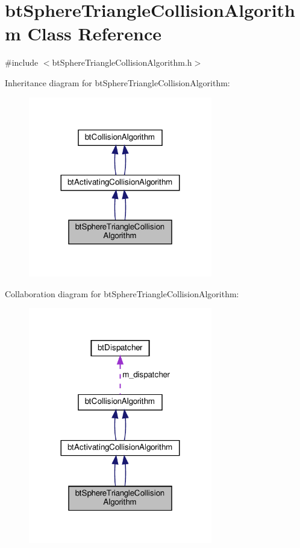 \hypertarget{classbtSphereTriangleCollisionAlgorithm}{}\section{bt\+Sphere\+Triangle\+Collision\+Algorithm Class Reference}
\label{classbtSphereTriangleCollisionAlgorithm}


{\ttfamily \#include $<$bt\+Sphere\+Triangle\+Collision\+Algorithm.\+h$>$}



Inheritance diagram for bt\+Sphere\+Triangle\+Collision\+Algorithm\+:
\nopagebreak
\begin{figure}[H]
\begin{center}
\leavevmode
\includegraphics[width=227pt]{classbtSphereTriangleCollisionAlgorithm__inherit__graph}
\end{center}
\end{figure}


Collaboration diagram for bt\+Sphere\+Triangle\+Collision\+Algorithm\+:
\nopagebreak
\begin{figure}[H]
\begin{center}
\leavevmode
\includegraphics[width=227pt]{classbtSphereTriangleCollisionAlgorithm__coll__graph}
\end{center}
\end{figure}
